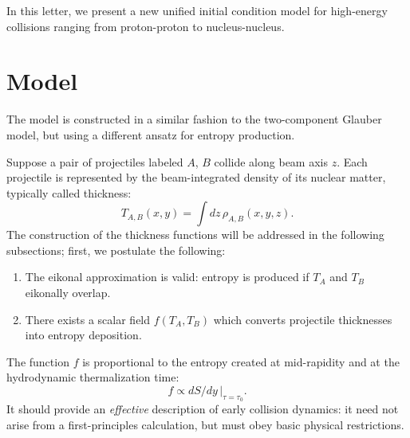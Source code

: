 \documentclass[aps,prl,reprint,amsmath,nofootinbib]{revtex4-1}
\begin{document}
In this letter, we present a new unified initial condition model for high-energy collisions ranging from
proton-proton to nucleus-nucleus.


\section{Model}

The model is constructed in a similar fashion to the two-component Glauber model, but using a different ansatz
for entropy production.

Suppose a pair of projectiles labeled $A$, $B$ collide along beam axis $z$.  Each projectile is represented by
the beam-integrated density of its nuclear matter, typically called thickness:
\begin{equation}
  T_{A,B}(x, y) = \int dz \, \rho_{A,B}(x, y, z).
\end{equation}
The construction of the thickness functions will be addressed in the following subsections; first, we
postulate the following:
\begin{enumerate}
  \item The eikonal approximation is valid:  entropy is produced if $T_A$ and $T_B$ eikonally overlap.
  \item There exists a scalar field $f(T_A, T_B)$ which converts projectile thicknesses into entropy
    deposition.
\end{enumerate}
The function $f$ is proportional to the entropy created at mid-rapidity and at the hydrodynamic thermalization
time:
\begin{equation}
  f \propto dS/dy \, |_{\tau = \tau_0}.
\end{equation}
It should provide an \emph{effective} description of early collision dynamics:  it need not arise from a
first-principles calculation, but must obey basic physical restrictions.
\end{document}

